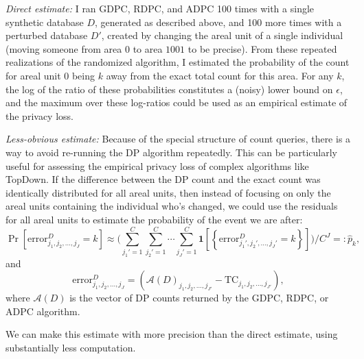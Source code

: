 \documentclass{article}
\begin{document}
\emph{Direct estimate:} I ran GDPC, RDPC, and ADPC 100 times with a single synthetic database $D$, generated as described above, and 100 more times with a perturbed database $D'$, created by changing the areal unit of a single individual (moving someone from area $0$ to area $1001$ to be precise). From these repeated realizations of the randomized algorithm, I estimated the probability of the count for areal unit $0$ being $k$ away from the exact total count for this area.  For any $k$, the log of the ratio of these probabilities constitutes a (noisy) lower bound on $\epsilon$, and the maximum over these log-ratios could be used as an empirical estimate of the privacy loss.


\emph{Less-obvious estimate:} Because of the special structure of count queries, there is a way to avoid re-running the DP algorithm repeatedly.  This can be particularly useful for assessing the empirical privacy loss of complex algorithms like TopDown. If the difference between the DP count and the exact count was identically distributed for all areal units, then instead of focusing on only the areal units containing the individual who's changed, we could use the residuals for all areal units to estimate the probability of the event we are after:
$$\Pr\left[\mathrm{error}_{j_1, j_2, \ldots, j_{J}}^D
= k\right]
\approx
\bigg(\sum_{j_1'=1}^C\sum_{j_2'=1}^C\cdots\sum_{j_J' = 1}^C \mathbf{1}\left[\left\{\mathrm{error}_{j_1', j_2', \ldots, j_{J}'}^D
= k\right\}\right]\bigg)\bigg/C^J =: \hat{p}_k,
$$
and $$\mathrm{error}_{j_1, j_2, \ldots, j_{J}}^D = \left(\mathcal{A}(D)_{j_1, j_2, \ldots, j_{J'}}
- \mathrm{TC}_{j_1, j_2, \ldots, j_{J'}}\right),$$
where $\mathcal{A}(D)$ is the vector of DP counts returned by the GDPC, RDPC, or ADPC algorithm.

We can make this estimate with more precision than the direct estimate, using substantially less computation.
\end{document}
